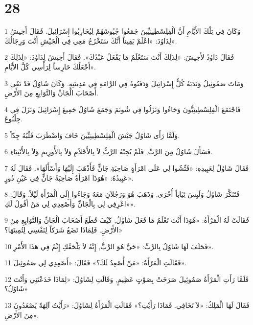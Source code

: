 \chapter{28}

\par 1 وَكَانَ فِي تِلْكَ الأَيَّامِ أَنَّ الْفِلِسْطِينِيِّينَ جَمَعُوا جُيُوشَهُمْ لِيُحَارِبُوا إِسْرَائِيلَ. فَقَالَ أَخِيشُ لِدَاوُدَ: «اعْلَمْ يَقِيناً أَنَّكَ سَتَخْرُجُ مَعِي فِي الْجَيْشِ أَنْتَ وَرِجَالُكَ».
\par 2 فَقَالَ دَاوُدُ لأَخِيشَ: «لِذَلِكَ أَنْتَ سَتَعْلَمُ مَا يَفْعَلُ عَبْدُكَ». فَقَالَ أَخِيشُ لِدَاوُدَ: «لِذَلِكَ أَجْعَلُكَ حَارِساً لِرَأْسِي كُلَّ الأَيَّامِ».
\par 3 وَمَاتَ صَمُوئِيلُ وَنَدَبَهُ كُلُّ إِسْرَائِيلَ وَدَفَنُوهُ فِي الرَّامَةِ فِي مَدِينَتِهِ. وَكَانَ شَاوُلُ قَدْ نَفَى أَصْحَابَ الْجَانِّ وَالتَّوَابِعِ مِنَ الأَرْضِ.
\par 4 فَاجْتَمَعَ الْفِلِسْطِينِيُّونَ وَجَاءُوا وَنَزَلُوا فِي شُونَمَ وَجَمَعَ شَاوُلُ جَمِيعَ إِسْرَائِيلَ وَنَزَلَ فِي جِلْبُوعَ.
\par 5 وَلَمَّا رَأَى شَاوُلُ جَيْشَ الْفِلِسْطِينِيِّينَ خَافَ وَاضْطَرَبَ قَلْبُهُ جِدّاً.
\par 6 فَسَأَلَ شَاوُلُ مِنَ الرَّبِّ, فَلَمْ يُجِبْهُ الرَّبُّ لاَ بِالأَحْلاَمِ وَلاَ بِالأُورِيمِ وَلاَ بِالأَنْبِيَاءِ.
\par 7 فَقَالَ شَاوُلُ لِعَبِيدِهِ: «فَتِّشُوا لِي عَلَى امْرَأَةٍ صَاحِبَةِ جَانٍّ فَأَذْهَبَ إِلَيْهَا وَأَسْأَلَهَا». فَقَالَ لَهُ عَبِيدُهُ: «هُوَذَا امْرَأَةٌ صَاحِبَةُ جَانٍّ فِي عَيْنِ دُورٍ».
\par 8 فَتَنَكَّرَ شَاوُلُ وَلَبِسَ ثِيَاباً أُخْرَى, وَذَهَبَ هُوَ وَرَجُلاَنِ مَعَهُ وَجَاءُوا إِلَى الْمَرْأَةِ لَيْلاً. وَقَالَ: «اعْرِفِي لِي بِالْجَانِّ وَأَصْعِدِي لِي مَنْ أَقُولُ لَكِ».
\par 9 فَقَالَتْ لَهُ الْمَرْأَةُ: «هُوَذَا أَنْتَ تَعْلَمُ مَا فَعَلَ شَاوُلُ, كَيْفَ قَطَعَ أَصْحَابَ الْجَانِّ وَالتَّوَابِعِ مِنَ الأَرْضِ. فَلِمَاذَا تَضَعُ شَرَكاً لِنَفْسِي لِتُمِيتَهَا؟»
\par 10 فَحَلَفَ لَهَا شَاوُلُ بِالرَّبِّ: «حَيٌّ هُوَ الرَّبُّ, إِنَّهُ لاَ يَلْحَقُكِ إِثْمٌ فِي هَذَا الأَمْرِ».
\par 11 فَقَالَتِ الْمَرْأَةُ: «مَنْ أُصْعِدُ لَكَ؟» فَقَالَ: «أَصْعِدِي لِي صَمُوئِيلَ».
\par 12 فَلَمَّا رَأَتِ الْمَرْأَةُ صَمُوئِيلَ صَرَخَتْ بِصَوْتٍ عَظِيمٍ, وَقَالَتِ لِشَاوُلَ: «لِمَاذَا خَدَعْتَنِي وَأَنْتَ شَاوُلُ؟»
\par 13 فَقَالَ لَهَا الْمَلِكُ: «لاَ تَخَافِي. فَمَاذَا رَأَيْتِ؟» فَقَالَتِ الْمَرْأَةُ لِشَاوُلَ: «رَأَيْتُ آلِهَةً يَصْعَدُونَ مِنَ الأَرْضِ».
